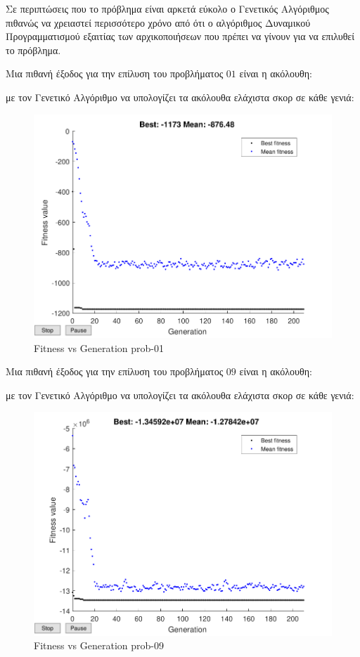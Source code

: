 \documentclass{article}
\begin{document}
Σε περιπτώσεις που το πρόβλημα είναι αρκετά εύκολο ο Γενετικός Αλγόριθμος
πιθανώς να χρειαστεί περισσότερο χρόνο από ότι ο αλγόριθμος Δυναμικού
Προγραμματισμού εξαιτίας των αρχικοποιήσεων που πρέπει να γίνουν για να επιλυθεί
το πρόβλημα.

Μια πιθανή έξοδος για την επίλυση του προβλήματος $01$ είναι η ακόλουθη:



με τον Γενετικό Αλγόριθμο να υπολογίζει τα ακόλουθα ελάχιστα σκορ σε κάθε γενιά:

\begin{figure}[H]
\includegraphics[max height = 0.5\textheight]{Fitness_vs_Generation_prob_01}
\centering
\caption{Fitness vs Generation prob-01}
\centering
\end{figure}

Μια πιθανή έξοδος για την επίλυση του προβλήματος $09$ είναι η ακόλουθη:



με τον Γενετικό Αλγόριθμο να υπολογίζει τα ακόλουθα ελάχιστα σκορ σε κάθε γενιά:

\begin{figure}[H]
\includegraphics[max height = 0.5\textheight]{Fitness_vs_Generation_prob_09}
\centering
\caption{Fitness vs Generation prob-09}
\centering
\end{figure}
\end{document}
